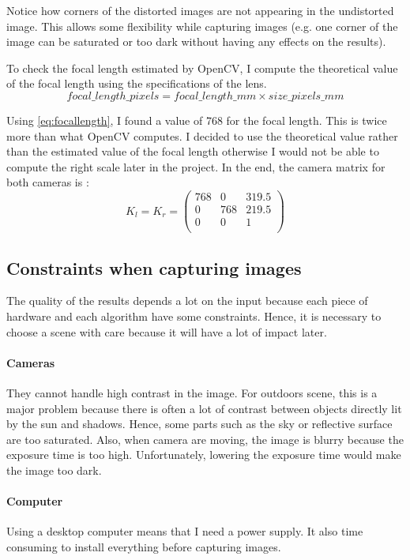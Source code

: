 \documentclass[11pt]{report}
\begin{document}
Notice how corners of the distorted images are not appearing in the undistorted image. This allows some flexibility while capturing images (e.g. one corner of the image can be saturated or too dark without having any effects on the results).

To check the focal length estimated by OpenCV, I compute the theoretical value of the focal length using the specifications of the lens.
\begin{equation}
focal\_length\_pixels = focal\_length\_mm \times size\_pixels\_mm
\label{eq:focallength}
\end{equation}

Using \ref{eq:focallength}, I found a value of 768 for the focal length. This is twice more than what OpenCV computes. I decided to use the theoretical value rather than the estimated value of the focal length otherwise I would not be able to compute the right scale later in the project. In the end, the camera matrix for both cameras is :
\[
  K_l = K_r = 
\left (
\begin{matrix}
  768 & 0 & 319.5 \\
  0 & 768 & 219.5 \\
  0 & 0 & 1 \\
\end{matrix}
\right )
\]

\subsection{Constraints when capturing images}

The quality of the results depends a lot on the input because each piece of hardware and each algorithm have some constraints. Hence, it is necessary to choose a scene with care because it will have a lot of impact later. 

\paragraph{Cameras} They cannot handle high contrast in the image. For outdoors scene, this is a major problem because there is often a lot of contrast between objects directly lit by the sun and shadows. Hence, some parts such as the sky or reflective surface are too saturated. Also, when camera are moving, the image is blurry because the exposure time is too high. Unfortunately, lowering the exposure time would make the image too dark.
\paragraph{Computer}
 Using a desktop computer means that I need a power supply. It also time consuming to install everything before capturing images.
\end{document}
